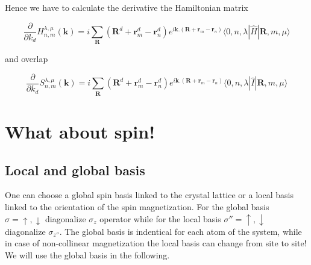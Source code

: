 \documentclass{article}
\newcommand{\bra}[1]{\langle #1|}
\newcommand{\ket}[1]{|#1\rangle}
\newcommand{\op}[1]{\hat{#1}}
\begin{document}
 \noindent
 Hence we have to calculate the derivative the Hamiltonian matrix
 
\[\displaystyle \frac{\partial}{\partial k_{d}}H_{n,m}^{\lambda,\mu}(\mathbf{k})=
i \sum_{\mathbf{R}} (\mathbf{R}^{d}+\mathbf{r}_{m}^{d}-\mathbf{r}_n^{d})e^{i\mathbf{k}.(\mathbf{R}+\mathbf{r}_{m}-\mathbf{r}_n)} \bra{ 0,n,\lambda} \op{H} \ket{\mathbf{R},m,\mu}\]

\noindent and overlap

\[\displaystyle  \frac{\partial}{\partial k_{d}} S_{n,m}^{\lambda,\mu}(\mathbf{k})=
i\sum_{\mathbf{R}} (\mathbf{R}^{d}+\mathbf{r}_{m}^{d}-\mathbf{r}_n^{d})e^{i\mathbf{k}.(\mathbf{R}+\mathbf{r}_{m}-\mathbf{r}_n)}
\bra{ 0,n,\lambda}\op{I}\ket{\mathbf{R},m,\mu }\]


\section{What about spin!}

\subsection{Local and global basis}

\noindent
One can choose a global spin basis linked to the crystal lattice or a local basis linked to the orientation of the spin magnetization. For the global basis
$\sigma=\uparrow, \downarrow$ diagonalize $\sigma_z$ operator while for the local basis $\sigma''=\uparrow, \downarrow$ diagonalize $\sigma_{z''}$.
The global basis is indentical for each atom of the system, while in case of non-collinear magnetization the local basis can change from site to site! We will use the global basis in the following.

\end{document}
